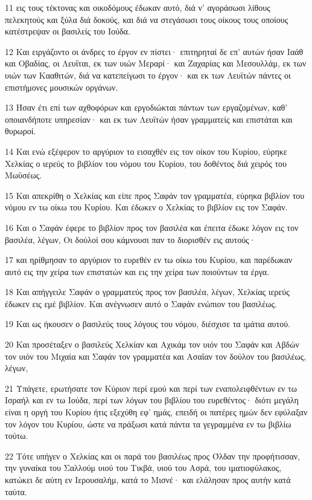 \par 11 εις τους τέκτονας και οικοδόμους έδωκαν αυτό, διά ν' αγοράσωσι λίθους πελεκητούς και ξύλα διά δοκούς, και διά να στεγάσωσι τους οίκους τους οποίους κατέστρεψαν οι βασιλείς του Ιούδα.
\par 12 Και ειργάζοντο οι άνδρες το έργον εν πίστει· επιτηρηταί δε επ' αυτών ήσαν Ιαάθ και Οβαδίας, οι Λευΐται, εκ των υιών Μεραρί· και Ζαχαρίας και Μεσουλλάμ, εκ των υιών των Κααθιτών, διά να κατεπείγωσι το έργον· και εκ των Λευϊτών πάντες οι επιστήμονες μουσικών οργάνων.
\par 13 Ήσαν έτι επί των αχθοφόρων και εργοδιώκται πάντων των εργαζομένων, καθ' οποιανδήποτε υπηρεσίαν· και εκ των Λευϊτών ήσαν γραμματείς και επιστάται και θυρωροί.
\par 14 Και ενώ εξέφερον το αργύριον το εισαχθέν εις τον οίκον του Κυρίου, εύρηκε Χελκίας ο ιερεύς το βιβλίον του νόμου του Κυρίου, του δοθέντος διά χειρός του Μωϋσέως.
\par 15 Και απεκρίθη ο Χελκίας και είπε προς Σαφάν τον γραμματέα, εύρηκα βιβλίον του νόμου εν τω οίκω του Κυρίου. Και έδωκεν ο Χελκίας το βιβλίον εις τον Σαφάν.
\par 16 Και ο Σαφάν έφερε το βιβλίον προς τον βασιλέα και έπειτα έδωκε λόγον εις τον βασιλέα, λέγων, Οι δούλοί σου κάμνουσι παν το διορισθέν εις αυτούς·
\par 17 και ηρίθμησαν το αργύριον το ευρεθέν εν τω οίκω του Κυρίου, και παρέδωκαν αυτό εις την χείρα των επιστατών και εις την χείρα των ποιούντων τα έργα.
\par 18 Και απήγγειλε Σαφάν ο γραμματεύς προς τον βασιλέα, λέγων, Χελκίας ιερεύς έδωκεν εις εμέ βιβλίον. Και ανέγνωσεν αυτό ο Σαφάν ενώπιον του βασιλέως.
\par 19 Και ως ήκουσεν ο βασιλεύς τους λόγους του νόμου, διέσχισε τα ιμάτια αυτού.
\par 20 Και προσέταξεν ο βασιλεύς Χελκίαν και Αχικάμ τον υιόν του Σαφάν και Αβδών τον υιόν του Μιχαία και Σαφάν τον γραμματέα και Ασαΐαν τον δούλον του βασιλέως, λέγων,
\par 21 Υπάγετε, ερωτήσατε τον Κύριον περί εμού και περί των εναπολειφθέντων εν τω Ισραήλ και εν τω Ιούδα, περί των λόγων του βιβλίου του ευρεθέντος· διότι μεγάλη είναι η οργή του Κυρίου ήτις εξεχύθη εφ' ημάς, επειδή οι πατέρες ημών δεν εφύλαξαν τον λόγον του Κυρίου, ώστε να πράξωσι κατά πάντα τα γεγραμμένα εν τω βιβλίω τούτω.
\par 22 Τότε υπήγεν ο Χελκίας και οι παρά του βασιλέως προς Όλδαν την προφήτισσαν, την γυναίκα του Σαλλούμ υιού του Τικβά, υιού του Ασρά, του ιματιοφύλακος, κατώκει δε αύτη εν Ιερουσαλήμ, κατά το Μισνέ· και ελάλησαν προς αυτήν κατά ταύτα.
